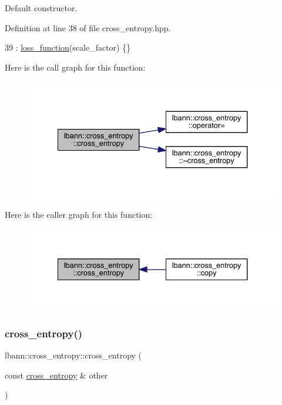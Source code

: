 Default constructor. 

Definition at line 38 of file cross\+\_\+entropy.\+hpp.


\begin{DoxyCode}
39     : \hyperlink{classlbann_1_1loss__function_a0c5745e661c59e3e5496888d233c07cf}{loss\_function}(scale\_factor) \{\}
\end{DoxyCode}
Here is the call graph for this function\+:\nopagebreak
\begin{figure}[H]
\begin{center}
\leavevmode
\includegraphics[width=334pt]{classlbann_1_1cross__entropy_a68520e75b1613caa6e845b26199df0ee_cgraph}
\end{center}
\end{figure}
Here is the caller graph for this function\+:\nopagebreak
\begin{figure}[H]
\begin{center}
\leavevmode
\includegraphics[width=334pt]{classlbann_1_1cross__entropy_a68520e75b1613caa6e845b26199df0ee_icgraph}
\end{center}
\end{figure}
\mbox{\label{classlbann_1_1cross__entropy_adb865fd99d2e8c9b3da748956363ed7f}} 
\subsubsection{\texorpdfstring{cross\+\_\+entropy()}{cross\_entropy()}\hspace{0.1cm}{\footnotesize\ttfamily [2/2]}}
{\footnotesize\ttfamily lbann\+::cross\+\_\+entropy\+::cross\+\_\+entropy (\begin{DoxyParamCaption}\item[{const \hyperlink{classlbann_1_1cross__entropy}{cross\+\_\+entropy} \&}]{other }\end{DoxyParamCaption})\hspace{0.3cm}{\ttfamily [default]}}

